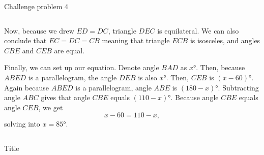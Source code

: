 \documentclass[9pt,aspectratio=169,handout]{beamer}
\begin{document}
\begin{frame}{Challenge problem 4}
\begin{columns}[T]
\begin{column}{0.5\textwidth}
Now, because we drew $ED = DC$, triangle $DEC$ is equilateral. We can also conclude that $EC=DC=CB$ meaning that triangle $ECB$ is isosceles, and angles $CBE$ and $CEB$ are equal.

Finally, we can set up our equation. Denote angle $BAD$ as $x°$. Then, because $ABED$ is a parallelogram, the angle $DEB$ is also $x°$. Then, $CEB$ is $(x-60)°$. Again because $ABED$ is a parallelogram, angle $ABE$ is $(180-x)°$. Subtracting angle $ABC$ gives that angle $CBE$ equals $(110-x)°$. Because angle $CBE$ equals angle $CEB$, we get\[x-60=110-x,\] solving into $x=\boxed{85°}$.
    \end{column}
  \end{columns}
\end{frame}

\begin{frame}{Title}
  \begin{columns}[T]
    \begin{column}{0.5\textwidth}
    \end{column}
    \begin{column}{0.5\textwidth}
    \end{column}
  \end{columns}
\end{frame}
\end{document}
